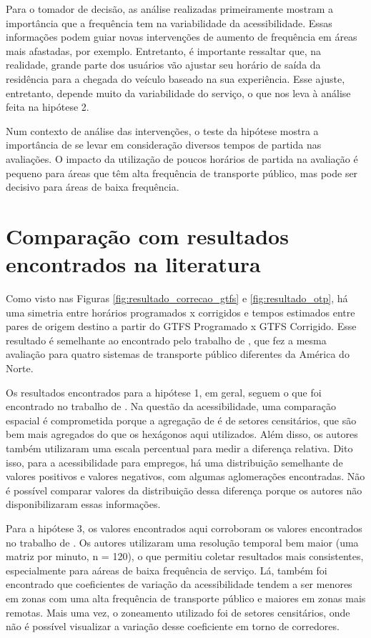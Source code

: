 \documentclass[        
    a4paper,          %
    12pt,             %
    chapter=TITLE,    %
    section=Title,    %
    subsection=Title, %
    oneside,          %
    english,          %
    spanish,          %
    brazil,           %
    fleqn             %
]{abntex2}
\begin{document}
  Para o tomador de decisão, as análise realizadas primeiramente mostram a importância que a frequência tem na variabilidade da acessibilidade. Essas informações podem guiar novas intervenções de aumento de frequência em áreas mais afastadas, por exemplo. Entretanto, é importante ressaltar que, na realidade, grande parte dos usuários vão ajustar seu horário de saída da residência para a chegada do veículo baseado na sua experiência. Esse ajuste, entretanto, depende muito da variabilidade do serviço, o que nos leva à análise feita na hipótese 2.
  
  Num contexto de análise das intervenções, o teste da hipótese mostra a importância de se levar em consideração diversos tempos de partida nas avaliações. O impacto da utilização de poucos horários de partida na avaliação é pequeno para áreas que têm alta frequência de transporte público, mas pode ser decisivo para áreas de baixa frequência.
  
  \hypertarget{comparacao-com-resultados-encontrados-na-literatura}{%
  \section{Comparação com resultados encontrados na literatura}\label{comparacao-com-resultados-encontrados-na-literatura}}
  
  Como visto nas Figuras \ref{fig:resultado_correcao_gtfs} e \ref{fig:resultado_otp}, há uma simetria entre horários programados x corrigidos e tempos estimados entre pares de origem destino a partir do GTFS Programado x GTFS Corrigido. Esse resultado é semelhante ao encontrado pelo trabalho de \citet{Wessel2019}, que fez a mesma avaliação para quatro sistemas de transporte público diferentes da América do Norte.
  
  Os resultados encontrados para a hipótese 1, em geral, seguem o que foi encontrado no trabalho de \citet{Wessel2017}. Na questão da acessibilidade, uma comparação espacial é comprometida porque a agregação de \citet{Wessel2017} é de setores censitários, que são bem mais agregados do que os hexágonos aqui utilizados. Além disso, os autores também utilizaram uma escala percentual para medir a diferença relativa. Dito isso, para a acessibilidade para empregos, há uma distribuição semelhante de valores positivos e valores negativos, com algumas aglomerações encontradas. Não é possível comparar valores da distribuição dessa diferença porque os autores não disponibilizaram essas informações.
  
  Para a hipótese 3, os valores encontrados aqui corroboram os valores encontrados no trabalho de \citet{Owen2015}. Os autores utilizaram uma resolução temporal bem maior (uma matriz por minuto, n = 120), o que permitiu coletar resultados mais consistentes, especialmente para aáreas de baixa frequência de serviço. Lá, também foi encontrado que coeficientes de variação da acessibilidade tendem a ser menores em zonas com uma alta frequência de transporte público e maiores em zonas mais remotas. Mais uma vez, o zoneamento utilizado foi de setores censitários, onde não é possível visualizar a variação desse coeficiente em torno de corredores.
  
\end{document}
